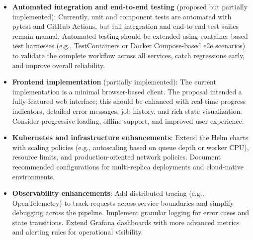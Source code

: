 \documentclass{scrartcl}
\begin{document}
\begin{itemize}
  \item \textbf{Automated integration and end-to-end testing} (proposed but partially implemented): Currently, unit and component tests are automated with pytest and GitHub Actions, but full integration and end-to-end test suites remain manual.
  Automated testing should be extended using container-based test harnesses (e.g., TestContainers or Docker Compose-based e2e scenarios) to validate the complete workflow across all services, catch regressions early, and improve overall reliability.

  \item \textbf{Frontend implementation} (partially implemented): The current implementation is a minimal browser-based client. The proposal intended a fully-featured web interface; this should be enhanced with real-time progress indicators, detailed error messages, job history, and rich state visualization. Consider progressive loading, offline support, and improved user experience.
  
  \item \textbf{Kubernetes and infrastructure enhancements}: Extend the Helm charts with scaling policies (e.g., autoscaling based on queue depth or worker CPU), resource limits, and production-oriented network policies. Document recommended configurations for multi-replica deployments and cloud-native environments.
  
  \item \textbf{Observability enhancements}: Add distributed tracing (e.g., OpenTelemetry) to track requests across service boundaries and simplify debugging across the pipeline. Implement granular logging for error cases and state transitions. Extend Grafana dashboards with more advanced metrics and alerting rules for operational visibility.
\end{itemize}

\nocite{*}


\end{document}
